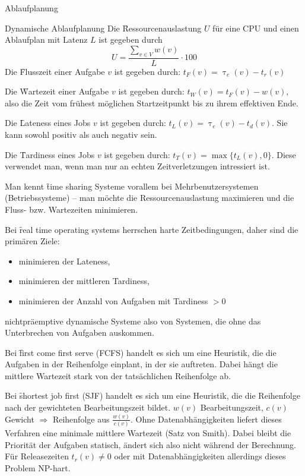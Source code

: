\begin{chapter}{Ablaufplanung}
\begin{section}{Dynamische Ablaufplanung}
   Die \f{Ressourcenauslastung} $U$ für eine CPU und einen Ablaufplan mit Latenz $L$ ist gegeben durch
   \[ U = \frac{\sum_{v\in V} w(v)}{L} \cdot 100 \]
   Die \f{Flusszeit} einer Aufgabe $v$ ist gegeben durch: $t_F(v) = \uptau_e(v)-t_r(v)$
   
   Die \f{Wartezeit} einer Aufgabe $v$ ist gegeben durch: $t_W(v) = t_F(v)-w(v)$, also die Zeit vom frühest möglichen Startzeitpunkt bis zu ihrem effektiven Ende.
   
   Die \f{Lateness} eines Jobs $v$ ist gegeben durch: $t_L(v) = \uptau_e(v) - t_d(v)$. Sie kann sowohl positiv als auch negativ sein. 
   
   Die \f{Tardiness} eines Jobs $v$ ist gegeben durch: $t_T(v) = \max\{ t_L(v),0 \}$. Diese verwendet man, wenn man nur an echten Zeitverletzungen intressiert ist.
   
   Man kennt \f{time sharing Systeme} vorallem bei Mehrbenutzersystemen (Betriebssysteme) -- man möchte die Ressourcenauslastung maximieren und die Fluss- bzw. Wartezeiten minimieren.
   
   Bei \f{real time operating systems} herrschen harte Zeitbedingungen, daher sind die primären Ziele: 
   \begin{itemize}
    \item minimieren der Lateness, 
    \item minimieren der mittleren Tardiness, 
    \item minimieren der Anzahl von Aufgaben mit Tardiness $> 0$ 
   \end{itemize}
  
  \begin{subsection}{nichtpräemptive dynamische Systeme}
   also von Systemen, die ohne das Unterbrechen von Aufgaben auskommen.
   
   Bei \f{first come first serve (FCFS)} handelt es sich um eine Heuristik, die die Aufgaben in der Reihenfolge einplant, in der sie auftreten. Dabei hängt die mittlere Wartezeit stark von der tatsächlichen Reihenfolge ab.
   
   Bei \f{shortest job first (SJF)} handelt es sich um eine Heuristik, die die Reihenfolge nach der gewichteten Bearbeitungszeit bildet. $w(v)$ Bearbeitungszeit, $c(v)$ Gewicht $\Rightarrow$ Reihenfolge aus $\frac{w(v)}{c(v)}$. Ohne Datenabhängigkeiten liefert dieses Verfahren eine minimale mittlere Wartezeit (Satz von Smith). Dabei bleibt die Priorität der Aufgaben statisch, ändert sich also nicht während der Berechnung. Für Releasezeiten $t_r(v) \neq 0$ oder mit Datenabhängigkeiten allerdings dieses Problem NP-hart.


\end{subsection}
\end{section}
\end{chapter}
